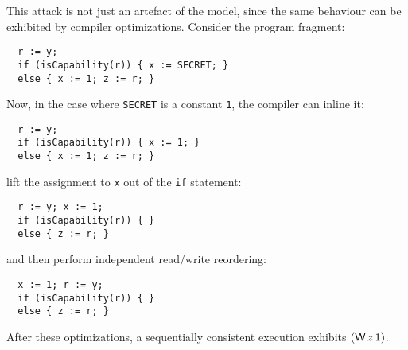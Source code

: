 This attack is not just an artefact of the model,
since the same behaviour can be exhibited by
compiler optimizations. Consider the program fragment:
\begin{verbatim}
  r := y;
  if (isCapability(r)) { x := SECRET; }
  else { x := 1; z := r; }
\end{verbatim}
Now, in the case where \verb|SECRET| is a constant \verb|1|,
the compiler can inline it:
\begin{verbatim}
  r := y;
  if (isCapability(r)) { x := 1; }
  else { x := 1; z := r; }
\end{verbatim}
lift the assignment to \verb|x| out of the \verb|if| statement:
\begin{verbatim}
  r := y; x := 1;
  if (isCapability(r)) { }
  else { z := r; }
\end{verbatim}
and then perform independent read/write reordering:
\begin{verbatim}
  x := 1; r := y;
  if (isCapability(r)) { }
  else { z := r; }
\end{verbatim}
After these optimizations, a sequentially consistent execution
exhibits $(\mathsf{W}\,z\,1)$.
